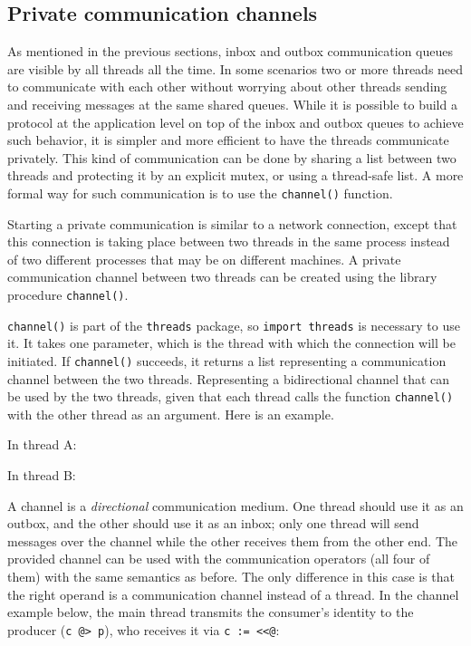 \subsection*{Private communication channels}

As mentioned in the previous sections, inbox and outbox communication queues are
visible by all threads all the time. In some scenarios two or more threads need
to communicate with each other without worrying about other threads sending and
receiving messages at the same shared queues. While it is possible to build a
protocol at the application level on top of the inbox and outbox queues to
achieve such behavior, it is simpler and more efficient to have the threads
communicate privately. This kind of communication can be done by sharing a list
between two threads and protecting it by an explicit mutex, or using a
thread-safe list. A more formal way for such communication is to use the
\texttt{channel()} function.

Starting a private communication is similar to a network connection, except that
this connection is taking place between two threads in the same process instead
of two different processes that may be on different machines. A private
communication channel between two threads can be created using the library
procedure \texttt{channel()}.

\texttt{channel()} is part of the \texttt{threads} package, so \texttt{import
  threads} is necessary to use it.  It takes one parameter, which is the thread
with which the connection will be initiated.  If \texttt{channel()} succeeds, it
returns a list representing a communication channel between the two
threads. Representing a bidirectional channel that can be used by the two
threads, given that each thread calls the function \texttt{channel()} with the
other thread as an argument.  Here is an example.

In thread A:


In thread B:


A channel is a \emph{directional} communication medium.  One thread should use
it as an outbox, and the other should use it as an inbox; only one thread will
send messages over the channel while the other receives them from the other
end. The provided channel can be used with the communication operators (all four
of them) with the same semantics as before. The only difference in this case is
that the right operand is a communication channel instead of a thread.  In the
channel example below, the main thread transmits the consumer's identity to the
producer (\texttt{c @> p}), who receives it via \texttt{c := <{}<@}:

